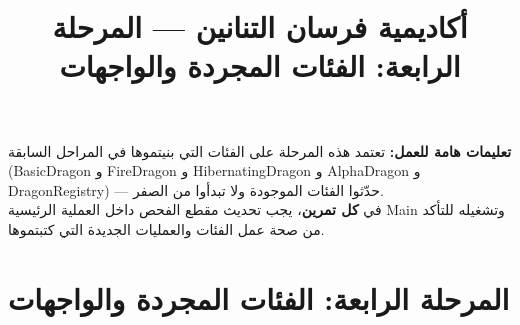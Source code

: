 \documentclass[14pt]{extarticle}
\title{أكاديمية فرسان التنانين — المرحلة الرابعة: الفئات المجردة والواجهات}
\begin{document}
\maketitle
\thispagestyle{fancy}

\begin{boxWarning}
\textbf{تعليمات هامة للعمل:}
تعتمد هذه المرحلة على الفئات التي بنيتموها في المراحل السابقة (\textenglish{BasicDragon} و \textenglish{FireDragon} و \textenglish{HibernatingDragon} و \textenglish{AlphaDragon} و \textenglish{DragonRegistry}) — حدّثوا الفئات الموجودة ولا تبدأوا من الصفر. \\
في \textbf{كل تمرين}، يجب تحديث مقطع الفحص داخل العملية الرئيسية \textenglish{Main} وتشغيله للتأكد من صحة عمل الفئات والعمليات الجديدة التي كتبتموها.
\end{boxWarning}

\section*{المرحلة الرابعة: الفئات المجردة والواجهات}
\end{document}
